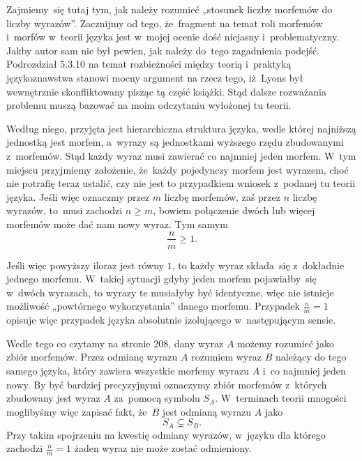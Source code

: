 \documentclass[a4paper,11pt]{article}
\begin{document}
\start {} Zajmiemy~się tutaj tym, jak należy rozumieć „stosunek
liczby morfemów do liczby wyrazów”. Zacznijmy od tego, że~fragment na temat
roli morfemów i~morfów w~teorii języka jest w~mojej ocenie dość niejasny
i~problematyczny. Jakby autor sam nie był pewien, jak należy do~tego
zagadnienia podejść. Podrozdział 5.3.10 na temat rozbieżności między teorią
i~praktyką językoznawstwa stanowi mocny argument na rzecz tego, iż~Lyons był
wewnętrznie skonfliktowany pisząc tą część książki. Stąd dalsze rozważania
problemu muszą bazować na moim odczytaniu wyłożonej tu teorii.

Według niego, przyjęta jest hierarchiczna struktura języka, wedle której
najniższą jednostką jest morfem, a~wyrazy są jednostkami wyższego rzędu
zbudowanymi z~morfemów. Stąd każdy wyraz musi zawierać co najmniej jeden
morfem. W~tym miejscu przyjmiemy założenie, że~każdy pojedynczy morfem jest
wyrazem, choć nie potrafię teraz ustalić, czy nie jest to przypadkiem
wniosek z~podanej tu teorii języka. Jeśli więc oznaczmy przez $m$ liczbę
morfemów, zaś przez $n$ liczbę wyrazów, to~musi zachodzi $n \geq m$, bowiem
połączenie dwóch lub więcej morfemów może dać nam nowy wyraz. Tym samym
\begin{equation}
  \label{eq:Lyons-Wstep-do-jezykoznawstwa-01}
  \frac{ n }{ m } \geq 1.
\end{equation}

Jeśli więc powyższy iloraz jest równy $1$, to każdy wyraz składa~się
z~dokładnie jednego morfemu. W~takiej sytuacji gdyby jeden morfem
pojawiałby~się w~dwóch wyrazach, to wyrazy te musiałyby być identyczne, więc
nie istnieje możliwość „powtórnego wykorzystania” danego morfemu.
Przypadek $\frac{ n }{ m } = 1$ opisuje więc przypadek języka
absolutnie izolującego w~następującym sensie.

Wedle tego co czytamy na stronie 208, dany wyraz $A$ możemy rozumieć jako
zbiór morfemów. Przez odmianę wyrazu $A$ rozumiem wyraz $B$ należący do tego
samego języka, który zawiera wszystkie morfemy wyrazu $A$ i~co najmniej
jeden nowy. By być bardziej precyzyjnymi oznaczymy zbiór morfemów z~których
zbudowany jest wyraz $A$ za~pomocą symbolu $S_{ A }$. W~terminach teorii
mnogości moglibyśmy więc zapisać fakt, że~$B$ jest odmianą wyrazu $A$ jako
\begin{equation}
  \label{eq:Lyons-Wstep-do-jezykoznawstwa-02}
  S_{ A } \subsetneq S_{ B }.
\end{equation}
Przy takim spojrzeniu na kwestię odmiany wyrazów, w~języku dla którego
zachodzi $\frac{ n }{ m } = 1$ żaden wyraz nie może zostać odmieniony.
\end{document}
